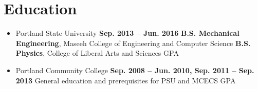 \documentclass[letterpaper]{article}
\begin{document}
\section{Education}
\begin{center}
\begin{itemize}
\item Portland State University		\hfill\textbf{Sep. 2013 -- Jun. 2016}
	\subitem \textbf{B.S. Mechanical Engineering}, Maseeh College of Engineering and Computer Science 
	\subitem\textbf{B.S. Physics}, College of Liberal Arts and Sciences
	 GPA
\\
\item Portland Community College  \hfill\textbf{Sep. 2008 -- Jun. 2010, Sep. 2011 -- Sep. 2013}
	\subitem General education and prerequisites for PSU and MCECS 
	 GPA
\end{itemize}

% 
% 
% 
% 
\end{center}

\end{document}

